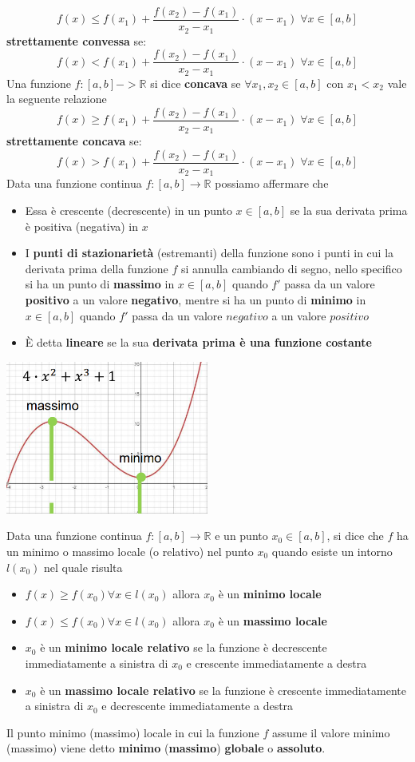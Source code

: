 \documentclass[12pt]{article}
\begin{document}
$$f(x) \leq f(x_1) + \frac{f(x_2) - f(x_1)}{x_2 - x_1} \cdot (x - x_1) \; \forall x \in [a,b]$$
\textbf{strettamente convessa} se:
$$f(x) < f(x_1) + \frac{f(x_2) - f(x_1)}{x_2 - x_1} \cdot (x - x_1) \; \forall x \in [a,b]$$
Una funzione $f:[a,b] -> \mathbb{R}$ si dice \textbf{concava} se $\forall x_1, x_2 \in [a,b]$ con $x_1 < x_2$ vale la seguente relazione
$$f(x) \geq f(x_1) + \frac{f(x_2) - f(x_1)}{x_2 - x_1} \cdot (x - x_1) \; \forall x \in [a,b]$$
\textbf{strettamente concava} se:
$$f(x) > f(x_1) + \frac{f(x_2) - f(x_1)}{x_2 - x_1} \cdot (x - x_1) \; \forall x \in [a,b]$$
Data una funzione continua $f:[a,b] \rightarrow \mathbb{R}$ possiamo affermare che
\begin{itemize}
    \item Essa è crescente (decrescente) in un punto $x \in [a,b]$ se la sua derivata prima è positiva (negativa) in $x$
    \item I \textbf{punti di stazionarietà} (estremanti) della funzione sono i punti in cui la derivata prima della funzione $f$ si annulla cambiando di segno,
    nello specifico si ha un punto di \textbf{massimo} in $x \in [a,b]$ quando $f'$ passa da un valore \textbf{positivo} a un valore \textbf{negativo}, mentre si ha un punto di
    \textbf{minimo} in $x \in [a,b]$ quando $f'$ passa da un valore $negativo$ a un valore $positivo$
    \item È detta \textbf{lineare} se la sua \textbf{derivata prima è una funzione costante}
\end{itemize}
\begin{center}
    \includegraphics[width = 0.50\textwidth]{Images/1.PNG}
\end{center}
Data una funzione continua $f:[a,b] \rightarrow \mathbb{R}$ e un punto $x_0 \in [a,b]$, si dice che $f$ ha un minimo o massimo locale (o relativo) nel punto 
$x_0$ quando esiste un intorno $l(x_0)$ nel quale risulta
\begin{itemize}
    \item $f(x) \geq f(x_0) \forall x \in l(x_0)$ allora $x_0$ è un \textbf{minimo locale}
    \item $f(x) \leq f(x_0) \forall x \in l(x_0)$ allora $x_0$ è un \textbf{massimo locale}
    \item $x_0$ è un \textbf{minimo locale relativo} se la funzione è decrescente immediatamente a sinistra di $x_0$ e crescente immediatamente a destra
    \item $x_0$ è un \textbf{massimo locale relativo} se la funzione è crescente immediatamente a sinistra di $x_0$ e decrescente immediatamente a destra 
\end{itemize}
Il punto minimo (massimo) locale in cui la funzione $f$ assume il valore minimo (massimo) viene detto \textbf{minimo} (\textbf{massimo}) \textbf{globale} o \textbf{assoluto}.
\end{document}
